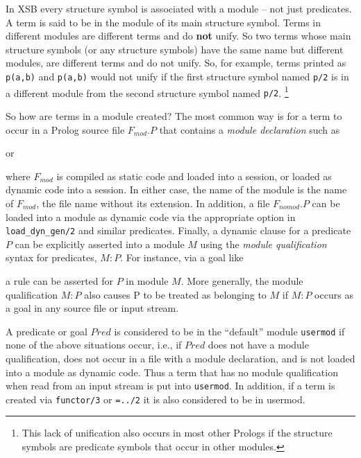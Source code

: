 In XSB every structure symbol is associated with a module -- not just
predicates.  A term is said to be in the module of its main structure
symbol.  Terms in different modules are different terms and do {\bf
  not} unify.  So two terms whose main structure symbols (or any
structure symbols) have the same name but different modules, are
different terms and do not unify.  So, for example, terms printed as
{\tt p(a,b)} and {\tt p(a,b)} would not unify if the first structure
symbol named {\tt p/2} is in a different module from the second
structure symbol named {\tt p/2}. \footnote{This lack of unification
  also occurs in most other Prologs if the structure symbols are
  predicate symbols that occur in other modules.}

So how are terms in a module created?  The most common way
is for a term to occur in a Prolog source file $F_{mod}.P$ that contains
a {\em module declaration} such as


or


\noindent 
where $F_{mod}$ is compiled as static code and loaded into a session,
or loaded as dynamic code into a session.  In either case, the name of
the module is the name of $F_{mod}$, the file name without its extension.
In addition, a file $F_{nomod}.P$ can be loaded into a module as dynamic
code via the appropriate option in {\tt load\_dyn\_gen/2} and similar
predicates.  Finally, a dynamic clause for a predicate $P$ can be
explicitly asserted into a module $M$ using the {\em module
  qualification} syntax for predicates, $M:P$.  For instance, via a
goal like


\noindent
a rule can be asserted for $P$ in module $M$.  More generally, the
module qualification $M:P$ also causes P to be treated as belonging to
$M$ if $M:P$ occurs as a goal in any source file or input stream.


A predicate or goal $Pred$ is considered to be in the ``default''
module {\tt usermod} if none of the above situations occur,  i.e., if
$Pred$ does not have a module qualification, does not occur in a file
with a module declaration, and is not loaded into a module as dynamic
code.  Thus a term that has no module qualification when read from an
input stream is put into {\tt usermod}.  In addition, if a term is
created via {\tt functor/3} or {\tt =../2} it is also considered to be
in usermod.

